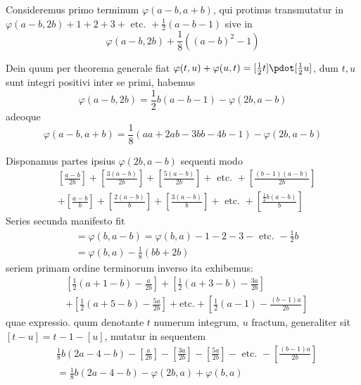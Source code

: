 Consideremus primo terminum $\varphi(a-b,a+b)$, qui protinus transmutatur in $\varphi(a-b,2b)+1+2+3+\text{ etc. }+\frac12(a-b-1)$ sive in
\[
\varphi(a-b,2b)+\frac18((a-b)^2-1)
\]

Dein quum per theorema generale fiat $\varphi(t,u)+\varphi(u,t)=[\frac12t]\pdot[\frac12u]$, dum $t,u$ sunt integri positivi inter se primi, habemus
\[
\varphi(a-b,2b)=\frac12b(a-b-1)-\varphi(2b,a-b)
\]
adeoque
\[
\varphi(a-b,a+b)=\frac18(aa+2ab-3bb-4b-1)-\varphi(2b,a-b)
\]

Disponamus partes ipsius $\varphi(2b,a-b)$ sequenti modo
\[
\begin{aligned}
&\left[\frac{a-b}{2b}\right]+\left[\frac{3(a-b)}{2b}\right]+\left[\frac{5(a-b)}{2b}\right]+\text{ etc. }+\left[\frac{(b-1)(a-b)}{2b}\right]\\
&+\left[\frac{a-b}{b}\right]+\left[\frac{2(a-b)}{b}\right]+\left[\frac{3(a-b)}{b}\right]+\text{ etc. }+\left[\frac{\frac12b(a-b)}{b}\right]
\end{aligned}
\]
Series secunda manifesto fit
\[
\begin{aligned}
&=\varphi(b,a-b)=\varphi(b,a)-1-2-3-\text{ etc. }-\frac12b\\
&=\varphi(b,a)-\frac18(bb+2b)
\end{aligned}
\]
seriem primam ordine terminorum inverso ita exhibemus:
\[
\begin{aligned}
&\left[\frac12(a+1-b)-\frac{a}{2b}\right]+\left[\frac12(a+3-b)-\frac{3a}{2b}\right]\\
&+\left[\frac12(a+5-b)-\frac{5a}{2b}\right]+\text{etc.}+\left[\frac12(a-1)-\frac{(b-1)a}{2b}\right]
\end{aligned}
\]
quae expressio. quum denotante $t$ numerum integrum, $u$ fractum, generaliter sit $[t-u]=t-1-[u]$, mutatur in sequentem
\[
\begin{aligned}
&\frac18b(2a-4-b)-\left[\frac{a}{2b}\right]-\left[\frac{3a}{2b}\right]-\left[\frac{5a}{2b}\right]-\text{ etc. }-\left[\frac{(b-1)a}{2b}\right]\\
&=\frac18b(2a-4-b)-\varphi(2b,a)+\varphi(b,a)
\end{aligned}
\]

